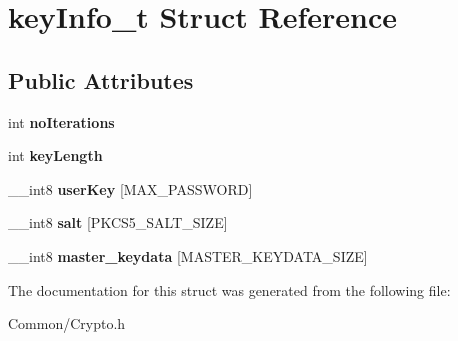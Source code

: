 \hypertarget{structkey_info__t}{}\section{key\+Info\+\_\+t Struct Reference}
\label{structkey_info__t}
\subsection*{Public Attributes}
\begin{DoxyCompactItemize}
\item 
\mbox{\label{structkey_info__t_a94a6ad9c661a446681f53c38b03b13ec}} 
int {\bfseries no\+Iterations}
\item 
\mbox{\label{structkey_info__t_ac2264883ca64a0dcdba41bfba40634b1}} 
int {\bfseries key\+Length}
\item 
\mbox{\label{structkey_info__t_a1f53e0e6bda6172397fb1640df8a6a1e}} 
\+\_\+\+\_\+int8 {\bfseries user\+Key} \mbox{[}M\+A\+X\+\_\+\+P\+A\+S\+S\+W\+O\+RD\mbox{]}
\item 
\mbox{\label{structkey_info__t_ac329b2f7bcc251b2311026dea89cd262}} 
\+\_\+\+\_\+int8 {\bfseries salt} \mbox{[}P\+K\+C\+S5\+\_\+\+S\+A\+L\+T\+\_\+\+S\+I\+ZE\mbox{]}
\item 
\mbox{\label{structkey_info__t_af7bfe7d403295bc0741751bb9738a0ea}} 
\+\_\+\+\_\+int8 {\bfseries master\+\_\+keydata} \mbox{[}M\+A\+S\+T\+E\+R\+\_\+\+K\+E\+Y\+D\+A\+T\+A\+\_\+\+S\+I\+ZE\mbox{]}
\end{DoxyCompactItemize}


The documentation for this struct was generated from the following file\+:\begin{DoxyCompactItemize}
\item 
Common/Crypto.\+h\end{DoxyCompactItemize}

